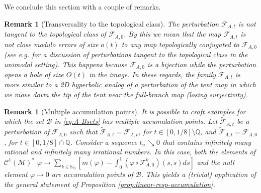 \documentclass{amsart}
\numberwithin{equation}{section}
\newtheorem{remark}[theorem]{Remark}
\newcommand\vf{\varphi}
\newcommand\cC{{\mathcal C}}
\newcommand\cF{{\mathcal F}}
\newcommand\cM{{\mathcal M}}
\newcommand\bN{{\mathbb N}}
\newcommand\bQ{{\mathbb Q}}
\newcommand{\catt}{\cF_{A,t}}
\newcommand{\cato}{\cF_{A,0}}
\begin{document}
We conclude this section with a couple of remarks.
\begin{remark}[Transversality to the topological class]
The perturbation \(\catt\) is not tangent to the topological class of \(\cato\). By this we mean that the map \(\catt\) is not close  modulo errors of size \(o(t)\) to any map topologically conjugated to \(\cato\) (see e.g. \cite{BS08} for a discussion of perturbations tangent to the topological class in the unimodal setting). This happens because \(\cato\) is a bijection while the perturbation opens a hole of size \(O(t)\) in the image. In these regards, the family \(\catt\) is more similar to a 2D hyperbolic analog of a perturbation of the tent map in which we move down the tip of the tent near the full-branch map (losing surjectivity).
\end{remark}

\begin{remark}[Multiple accumulation points]
It is possible to craft examples for which the set \(\mathscr B\) in \eqref{eq:A-Bsets} has multiple accumulation points. Let \(\widetilde \catt\) be a perturbation of \(\cato\) such that \(\widetilde \catt = \catt\), for \(t \in [0,1/8]\setminus \bQ\), and \(\widetilde \catt = \cato\), for \(t \in [0,1/8]\cap \bQ\). Consider a sequence \(t_n \searrow 0\) that contains infinitely many rational and infinitely many irrational numbers. In this case, both the elements of \({\cC^1(\cM)}^{\star}\) \(\vf \to \sum_{k \in \bN_0} \left[m(\vf) - \int_0^1 (\vf \circ \cato^k)(s,s)ds \right]\) and the null element \(\vf \to 0\) are accumulation points of \(\mathscr B\). This yields a (trivial) application of the general statement of Proposition \ref{prop:linear-resp-accumulation}.
\end{remark}
\end{document}
